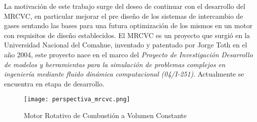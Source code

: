 La motivación de este trabajo surge del deseo de continuar con el desarrollo
del MRCVC, en particular mejorar el pre diseño de los sistemas de intercambio de
gases sentando las bases para una futura optimización de los mismos en un motor
con requisitos de diseño establecidos.
%
El MRCVC es un proyecto que surgió en la Universidad Nacional del Comahue,
inventado y patentado por Jorge Toth\cite{toth} en el año 2004, este proyecto
nace en el marco del \emph{Proyecto de Investigación Desarrollo de modelos y
    herramientas para la simulación de problemas complejos en ingeniería
mediante fluido dinámica computacional (04/I-251)}. Actualmente se encuentra en
etapa de desarrollo.

\begin{figure}
    \centering
    \texttt{[image: perspectiva\_mrcvc.png]}
    \caption{Motor Rotativo de Combustión a Volumen Constante}
    \label{fig:mrcvc}
\end{figure}
